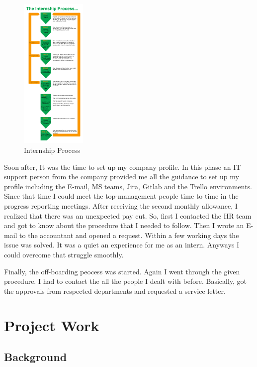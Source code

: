 \documentclass[twoside,12pt,times,onecolumn,a4paper]{report}
\begin{document}
\begin{figure}
    \centering
    \includegraphics[width=0.28\textwidth]{intern}
    \caption{Internship Process}
\end{figure}

 Soon after, It was the time to set up my company profile. In this phase an IT support person from the company provided me all the guidance to set up my profile including the E-mail, MS teams, Jira, Gitlab and the Trello environments. Since that time I could meet the top-management people time to time in the progress reporting meetings. After receiving the second monthly allowance, I realized that there was an unexpected pay cut. So, first I contacted the HR team and got to know about the procedure that I needed to follow. Then I wrote an E-mail to the accountant and opened a request. Within a few working days the issue was solved. It was a quiet an experience for me as an intern. Anyways I could overcome that struggle smoothly. 

Finally, the off-boarding peocess was started. Again I went through the given procedure. I had to contact the all the people I dealt with before. Basically, got the approvals from respected departments and requested a service letter. 


\chapter{Project Work}

\section{Background}
\end{document}

